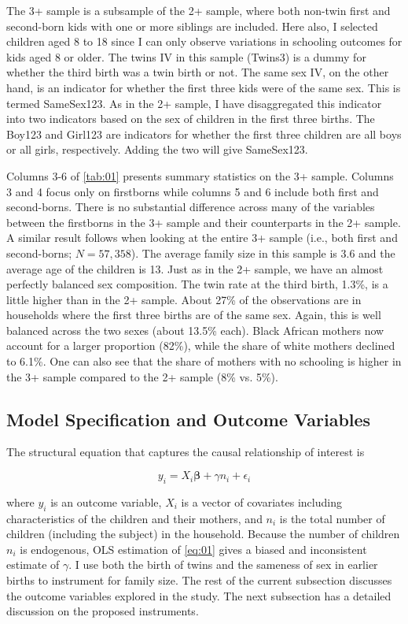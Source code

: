 The 3+ sample is a subsample of the 2+ sample, where both non-twin first and second-born kids with one or more siblings are included. Here also, I selected children aged 8 to 18 since I can only observe variations in schooling outcomes for kids aged 8 or older. The twins IV in this sample (Twins3) is a dummy for whether the third birth was a twin birth or not. The same sex IV, on the other hand, is an indicator for whether the first three kids were of the same sex. This is termed SameSex123. As in the 2+ sample, I have disaggregated this indicator into two indicators based on the sex of children in the first three births. The Boy123 and Girl123 are indicators for whether the first three children are all boys or all girls, respectively. Adding the two will give SameSex123. 

Columns 3-6 of \autoref{tab:01} presents summary statistics on the 3+ sample. Columns 3 and 4 focus only on firstborns while columns 5 and 6 include both first and second-borns. There is no substantial difference across many of the variables between the firstborns in the 3+ sample and their counterparts in the 2+ sample. A similar result follows when looking at the entire 3+ sample (i.e., both first and second-borns; $ N = 57,358 $). The average family size in this sample is 3.6 and the average age of the children is 13. Just as in the 2+ sample, we have an almost perfectly balanced sex composition. The twin rate at the third birth, 1.3\%, is a little higher than in the 2+ sample. About 27\% of the observations are in households where the first three births are of the same sex. Again, this is well balanced across the two sexes (about 13.5\% each). Black African mothers now account for a larger proportion (82\%), while the share of white mothers declined to 6.1\%. One can also see that the share of mothers with no schooling is higher in the 3+ sample compared to the 2+ sample (8\% vs. 5\%).    

\subsection*{Model Specification and Outcome Variables}

The structural equation that captures the causal relationship of interest is

\begin{equation}\label{eq:01}
	y_{i} = X_{i}\boldsymbol{\beta} + \gamma n_{i} + \epsilon_{i}
\end{equation}

where $ y_{i} $ is an outcome variable, $ X_{i} $ is a vector of covariates including characteristics of the children and their mothers, and $ n_{i} $ is the total number of children (including the subject) in the household. Because the number of children $ n_{i} $ is endogenous, OLS estimation of \eqref{eq:01} gives a biased and inconsistent estimate of $ \gamma $. I use both the birth of twins and the sameness of sex in earlier births to instrument for family size. The rest of the current subsection discusses the outcome variables explored in the study. The next subsection has a detailed discussion on the proposed instruments.  

